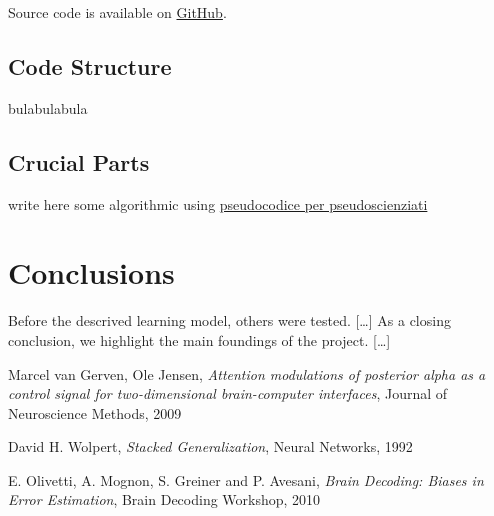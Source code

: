 \documentclass[10pt]{article}
\begin{document}
Source code is available on 
\href{https://github.com/mmaker/braindecoding}{GitHub}.

\subsection{Code Structure}
bulabulabula
\subsection{Crucial Parts}
write here some algorithmic using \href{https://en.wikibooks.org/wiki/LaTeX/Algorithms_and_Pseudocode}{pseudocodice per pseudoscienziati}


\section{Conclusions}
Before the descrived learning model, others were tested.
[\dots]
As a closing conclusion, we highlight the main foundings of the project.
[\dots]




\begin{thebibliography}{9}
Marcel van Gerven, Ole Jensen,
\emph{Attention modulations of posterior alpha as a control signal for two-dimensional brain-computer interfaces},
Journal of Neuroscience Methods, 2009

David H. Wolpert,
\emph{Stacked Generalization},
Neural Networks, 1992

E. Olivetti, A. Mognon, S. Greiner and P. Avesani, 
\emph{Brain Decoding: Biases in Error Estimation}, 
Brain Decoding Workshop, 2010

\end{thebibliography}
\end{document}
